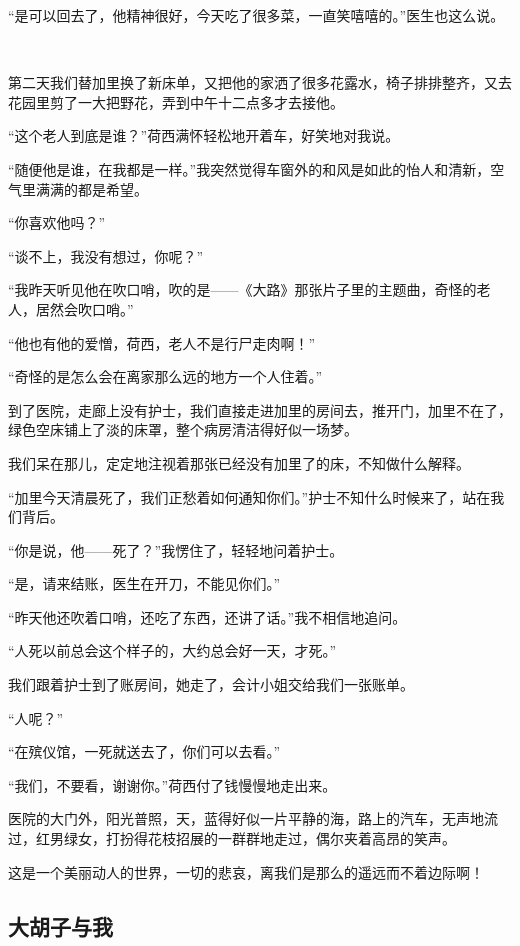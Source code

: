 \par “是可以回去了，他精神很好，今天吃了很多菜，一直笑嘻嘻的。”医生也这么说。
\par  
\par 第二天我们替加里换了新床单，又把他的家洒了很多花露水，椅子排排整齐，又去花园里剪了一大把野花，弄到中午十二点多才去接他。
\par “这个老人到底是谁？”荷西满怀轻松地开着车，好笑地对我说。
\par “随便他是谁，在我都是一样。”我突然觉得车窗外的和风是如此的怡人和清新，空气里满满的都是希望。
\par “你喜欢他吗？”
\par “谈不上，我没有想过，你呢？”
\par “我昨天听见他在吹口哨，吹的是——《大路》那张片子里的主题曲，奇怪的老人，居然会吹口哨。”
\par “他也有他的爱憎，荷西，老人不是行尸走肉啊！”
\par “奇怪的是怎么会在离家那么远的地方一个人住着。”
\par 到了医院，走廊上没有护士，我们直接走进加里的房间去，推开门，加里不在了，绿色空床铺上了淡的床罩，整个病房清洁得好似一场梦。
\par 我们呆在那儿，定定地注视着那张已经没有加里了的床，不知做什么解释。
\par “加里今天清晨死了，我们正愁着如何通知你们。”护士不知什么时候来了，站在我们背后。
\par “你是说，他——死了？”我愣住了，轻轻地问着护士。
\par “是，请来结账，医生在开刀，不能见你们。”
\par “昨天他还吹着口哨，还吃了东西，还讲了话。”我不相信地追问。
\par “人死以前总会这个样子的，大约总会好一天，才死。”
\par 我们跟着护士到了账房间，她走了，会计小姐交给我们一张账单。
\par “人呢？”
\par “在殡仪馆，一死就送去了，你们可以去看。”
\par “我们，不要看，谢谢你。”荷西付了钱慢慢地走出来。
\par 医院的大门外，阳光普照，天，蓝得好似一片平静的海，路上的汽车，无声地流过，红男绿女，打扮得花枝招展的一群群地走过，偶尔夹着高昂的笑声。
\par 这是一个美丽动人的世界，一切的悲哀，离我们是那么的遥远而不着边际啊！



\subsection{大胡子与我}

